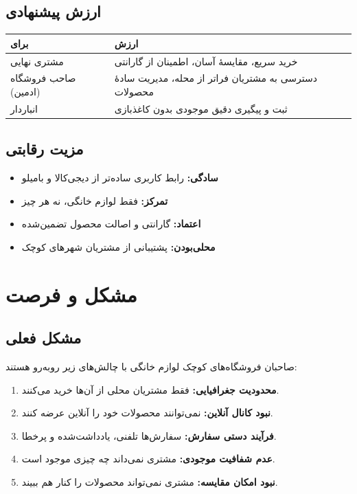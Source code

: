 \documentclass[12pt, a4paper]{article}
\begin{document}
\subsection{ارزش پیشنهادی}
\begin{center}
\begin{tabular}{|l|p{8cm}|}
\hline
\textbf{برای} & \textbf{ارزش} \\
\hline
مشتری نهایی & خرید سریع، مقایسهٔ آسان، اطمینان از گارانتی \\
\hline
صاحب فروشگاه (ادمین) & دسترسی به مشتریان فراتر از محله، مدیریت سادهٔ محصولات \\
\hline
انباردار & ثبت و پیگیری دقیق موجودی بدون کاغذبازی \\
\hline
\end{tabular}
\end{center}

\subsection{مزیت رقابتی}
\begin{itemize}
    \item \textbf{سادگی:} رابط کاربری ساده‌تر از دیجی‌کالا و بامیلو
    \item \textbf{تمرکز:} فقط لوازم خانگی، نه هر چیز
    \item \textbf{اعتماد:} گارانتی و اصالت محصول تضمین‌شده
    \item \textbf{محلی‌بودن:} پشتیبانی از مشتریان شهرهای کوچک
\end{itemize}

\section{مشکل و فرصت}

\subsection{مشکل فعلی}
صاحبان فروشگاه‌های کوچک لوازم خانگی با چالش‌های زیر روبه‌رو هستند:
\begin{enumerate}
    \item \textbf{محدودیت جغرافیایی:} فقط مشتریان محلی از آن‌ها خرید می‌کنند.
    \item \textbf{نبود کانال آنلاین:} نمی‌توانند محصولات خود را آنلاین عرضه کنند.
    \item \textbf{فرآیند دستی سفارش:} سفارش‌ها تلفنی، یادداشت‌شده و پرخطا.
    \item \textbf{عدم شفافیت موجودی:} مشتری نمی‌داند چه چیزی موجود است.
    \item \textbf{نبود امکان مقایسه:} مشتری نمی‌تواند محصولات را کنار هم ببیند.
\end{enumerate}
\end{document}

